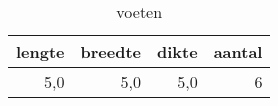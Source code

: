 \begin{table}[h!]
\centering
\caption{voeten}
\begin{tabular}{rrrr}
\toprule
 lengte &  breedte &  dikte &  aantal \\
\midrule
    5,0 &      5,0 &    5,0 &       6 \\
\bottomrule
\end{tabular}
\end{table}
